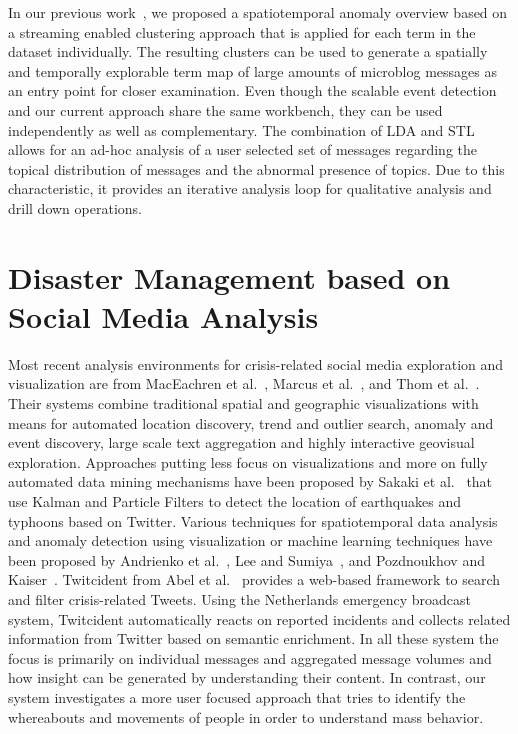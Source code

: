 In our previous work~\cite{Thom:2012:SAD}, we proposed a spatiotemporal anomaly overview based on a streaming enabled clustering approach that is applied for each term in the dataset individually.
The resulting clusters can be used to generate a spatially and temporally explorable term map of large amounts of microblog messages as an entry point for closer examination.
Even though the scalable event detection and our current approach share the same workbench, they can be used independently as well as complementary.
The combination of LDA and STL allows for an ad-hoc analysis of a user selected set of messages regarding the topical distribution of messages and the abnormal presence of topics.
Due to this characteristic, it provides an iterative analysis loop for qualitative analysis and drill down operations.


\section{Disaster Management based on Social Media Analysis}

Most recent analysis environments for crisis-related social media exploration and visualization are from MacEachren et al.~\cite{MacEachren:2011:SGA}, Marcus et al.~\cite{marcus2011twitinfo}, and Thom et al.~\cite{Thom:2012:SAD}.
Their systems combine traditional spatial and geographic visualizations with means for automated location discovery, trend and outlier search, anomaly and event discovery, large scale text aggregation and highly interactive geovisual exploration.
Approaches putting less focus on visualizations and more on fully automated data mining mechanisms have been proposed by Sakaki et al.~\cite{Sakaki:2010:EST} that use Kalman and Particle Filters to detect the location of earthquakes and typhoons based on Twitter.
Various techniques for spatiotemporal data analysis and anomaly detection using visualization or machine learning techniques have been proposed by Andrienko et al.~\cite{Andrienko:2001:ECC}, Lee and Sumiya~\cite{Lee:2010:MGR}, and Pozdnoukhov and Kaiser~\cite{Pozdnoukhov:2011:SDT}.
Twitcident from Abel et al.~\cite{abel2012semantics+} provides a web-based framework to search and filter crisis-related Tweets. Using the Netherlands emergency broadcast system, Twitcident automatically reacts on reported incidents and collects related information from Twitter based on semantic enrichment.
In all these system the focus is primarily on individual messages and aggregated message volumes and how insight can be generated by understanding their content. 
In contrast, our system investigates a more user focused approach that tries to identify the whereabouts and movements of people in order to understand mass behavior.


